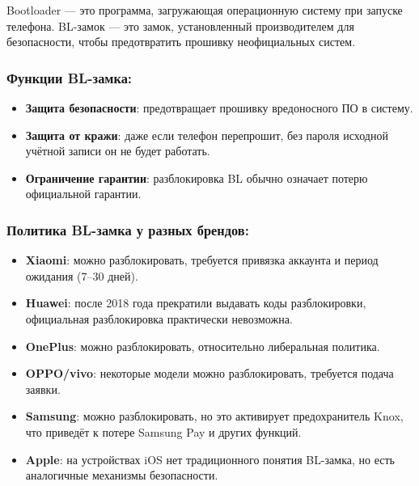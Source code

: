 
Bootloader — это программа, загружающая операционную систему при запуске телефона. BL-замок — это замок, установленный производителем для безопасности, чтобы предотвратить прошивку неофициальных систем.

\subsubsection*{Функции BL-замка:}

\begin{itemize}
  \item \textbf{Защита безопасности}: предотвращает прошивку вредоносного ПО в систему.
  \item \textbf{Защита от кражи}: даже если телефон перепрошит, без пароля исходной учётной записи он не будет работать.
  \item \textbf{Ограничение гарантии}: разблокировка BL обычно означает потерю официальной гарантии.
\end{itemize}

\subsubsection*{Политика BL-замка у разных брендов:}

\begin{itemize}
  \item \textbf{Xiaomi}: можно разблокировать, требуется привязка аккаунта и период ожидания (7–30 дней).
  \item \textbf{Huawei}: после 2018 года прекратили выдавать коды разблокировки, официальная разблокировка практически невозможна.
  \item \textbf{OnePlus}: можно разблокировать, относительно либеральная политика.
  \item \textbf{OPPO/vivo}: некоторые модели можно разблокировать, требуется подача заявки.
  \item \textbf{Samsung}: можно разблокировать, но это активирует предохранитель Knox, что приведёт к потере Samsung Pay и других функций.
  \item \textbf{Apple}: на устройствах iOS нет традиционного понятия BL-замка, но есть аналогичные механизмы безопасности.
\end{itemize}


